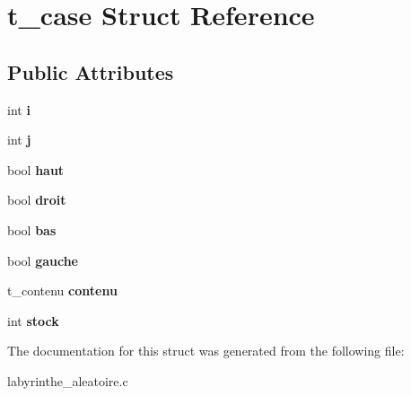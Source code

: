 \hypertarget{structt__case}{\section{t\+\_\+case Struct Reference}
\label{structt__case}
}
\subsection*{Public Attributes}
\begin{DoxyCompactItemize}
\item 
\hypertarget{structt__case_ac642ecdfc93ec2109d5edf7708052b76}{int {\bfseries i}}\label{structt__case_ac642ecdfc93ec2109d5edf7708052b76}

\item 
\hypertarget{structt__case_a60f7fc08cbadfa2813ec11b9e3ade4b4}{int {\bfseries j}}\label{structt__case_a60f7fc08cbadfa2813ec11b9e3ade4b4}

\item 
\hypertarget{structt__case_a75b66a58cfb0b1a620a378e0d3f51276}{bool {\bfseries haut}}\label{structt__case_a75b66a58cfb0b1a620a378e0d3f51276}

\item 
\hypertarget{structt__case_a5874ae2061829efd670efcd6a938182c}{bool {\bfseries droit}}\label{structt__case_a5874ae2061829efd670efcd6a938182c}

\item 
\hypertarget{structt__case_a36bc5a26c9c4d9b2317fdd5f6c4f2d27}{bool {\bfseries bas}}\label{structt__case_a36bc5a26c9c4d9b2317fdd5f6c4f2d27}

\item 
\hypertarget{structt__case_ab1ae25f6aff0dc8137ab8fb5fd3fd70d}{bool {\bfseries gauche}}\label{structt__case_ab1ae25f6aff0dc8137ab8fb5fd3fd70d}

\item 
\hypertarget{structt__case_aaaa2ae72916f18bf08ec01fba3da8e2e}{t\+\_\+contenu {\bfseries contenu}}\label{structt__case_aaaa2ae72916f18bf08ec01fba3da8e2e}

\item 
\hypertarget{structt__case_a02051ccfc6b97cd6bf5ca633754f3732}{int {\bfseries stock}}\label{structt__case_a02051ccfc6b97cd6bf5ca633754f3732}

\end{DoxyCompactItemize}


The documentation for this struct was generated from the following file\+:\begin{DoxyCompactItemize}
\item 
labyrinthe\+\_\+aleatoire.\+c\end{DoxyCompactItemize}
